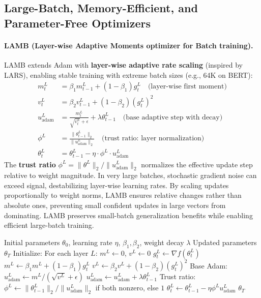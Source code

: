 \documentclass[11pt,a4paper]{article}
\begin{document}
\subsection{Large-Batch, Memory-Efficient, and Parameter-Free Optimizers}
\paragraph{LAMB (Layer-wise Adaptive Moments optimizer for Batch training).}
LAMB extends Adam with \textbf{layer-wise adaptive rate scaling} (inspired by LARS), enabling stable training with extreme batch sizes (e.g., 64K on BERT):
\begin{align}
m_t^L &= \beta_1 m_{t-1}^L + (1-\beta_1)g_t^L \quad\text{(layer-wise first moment)} \\
v_t^L &= \beta_2 v_{t-1}^L + (1-\beta_2)(g_t^L)^2 \\
u_{\text{adam}}^L &= \frac{m_t^L}{\sqrt{v_t^L}+\epsilon} + \lambda\theta_{t-1}^L \quad\text{(base adaptive step with decay)} \\
\phi^L &= \frac{\|\theta_{t-1}^L\|_2}{\|u_{\text{adam}}^L\|_2} \quad\text{(trust ratio: layer normalization)} \\
\theta_t^L &= \theta_{t-1}^L - \eta \cdot \phi^L \cdot u_{\text{adam}}^L
\end{align}
The \textbf{trust ratio} $\phi^L = \|\theta^L\|_2 / \|u_{\text{adam}}^L\|_2$ normalizes the effective update step relative to weight magnitude. In very large batches, stochastic gradient noise can exceed signal, destabilizing layer-wise learning rates. By scaling updates proportionally to weight norms, LAMB ensures relative changes rather than absolute ones, preventing small confident updates in large vectors from dominating. LAMB preserves small-batch generalization benefits while enabling efficient large-batch training.

\begin{algorithm}[H]
\caption{LAMB (Layer-wise Adaptive Moments optimizer for Batch training)}
\label{alg:lamb}
\begin{algorithmic}[1]
\Require Initial parameters $\theta_0$, learning rate $\eta$, $\beta_1, \beta_2$, weight decay $\lambda$
\Ensure Updated parameters $\theta_T$
\State Initialize: For each layer $L$: $m^L \gets 0$, $v^L \gets 0$
        \State $g_t^L \gets \nabla f(\theta_t^L)$
        \State $m^L \gets \beta_1 m^L + (1-\beta_1) g_t^L$
        \State $v^L \gets \beta_2 v^L + (1-\beta_2) (g_t^L)^2$
        \State Base Adam: $u_{\text{adam}}^L \gets m^L / (\sqrt{v^L} + \epsilon)$
            \State $u_{\text{adam}}^L \gets u_{\text{adam}}^L + \lambda \theta_{t-1}^L$
        \EndIf
        \State Trust ratio: $\phi^L \gets \|\theta_{t-1}^L\|_2 / \|u_{\text{adam}}^L\|_2$ if both nonzero, else $1$
        \State $\theta_t^L \gets \theta_{t-1}^L - \eta \phi^L u_{\text{adam}}^L$
    \EndFor
\EndFor
\Return $\theta_T$
\end{algorithmic}
\end{algorithm}
\end{document}

